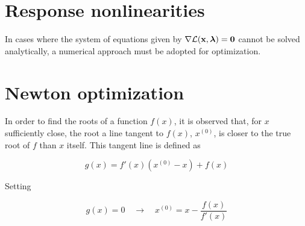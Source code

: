 \documentclass{article}
\newcommand{\Lagr}{\mathcal{L}}
\newcommand{\vect}[1]{\textbf{\textrm{#1}}}
\begin{document}

\begin{comment}
Presently, data is being collected for dLGN relay cell responses to a "full-field chirp" stimulus with optogenetic suppression of cortical feedback. 
The results from \cite{mobarhan2018} suggest that the response matrix to a chirp stimulus would contain higher power at some peak temporal frequency when cortical feedback is present.
\end{comment}


\section{Response nonlinearities}
\yel{[...]}

In cases where the system of equations given by $\nabla \Lagr(\vect{x},\bm{\lambda}) = \vect{0}$ cannot be solved analytically, a numerical approach must be adopted for optimization.

\begin{comment}
If $c(\vect{x})$ is re-defined as the $L_1$ norm of the stimulus vector (i.e. the plane $c(\vect{x}) = ||\vect{x}||_1 = \sum_n{|x_n|} - 1$), then a linear system is obtained which can be solved algorithmically (e.g. Gauss-Jordan elimination) without losing the main purpose of the constraint.
However, the plane defined by this constraint is not smooth, and therefore the equality constriant $c(\vect{x}) = \sum_n{|x_n|} - 1$ has to be split up into a set of inequality constraints \citep[ch.12, p. 306]{nocedal2006}. \yel{[This needs to be worked out further.]}
\end{comment}


\section{Newton optimization} \label{newtonmethod}
In order to find the roots of a function $f(x)$, it is observed that, for $x$ sufficiently close, the root a line tangent to $f(x)$, $x^{(0)}$, is closer to the true root of $f$ than $x$ itself. 
This tangent line is defined as

\begin{equation} \label{tangent1d}
	g(x) = f'(x)(x^{(0)} - x) + f(x)
\end{equation}

Setting

\begin{equation*}
	g(x) = 0 \quad \longrightarrow \quad x^{(0)} = x - \frac{f(x)}{f'(x)}
\end{equation*}
\end{document}
